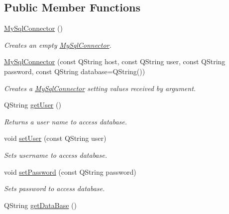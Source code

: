 \subsection*{Public Member Functions}
\begin{DoxyCompactItemize}
\item 
\mbox{\label{classMySqlConnector_af17a58a3749687938d0b3b15e276dab7}} 
\mbox{\hyperlink{classMySqlConnector_af17a58a3749687938d0b3b15e276dab7}{My\+Sql\+Connector}} ()
\begin{DoxyCompactList}\small\item\em Creates an empty \mbox{\hyperlink{classMySqlConnector}{My\+Sql\+Connector}}. \end{DoxyCompactList}\item 
\mbox{\hyperlink{classMySqlConnector_a86344c8e5fb792da1da746bdea3a2474}{My\+Sql\+Connector}} (const Q\+String host, const Q\+String user, const Q\+String password, const Q\+String database=Q\+String())
\begin{DoxyCompactList}\small\item\em Creates a \mbox{\hyperlink{classMySqlConnector}{My\+Sql\+Connector}} setting values received by argument. \end{DoxyCompactList}\item 
Q\+String \mbox{\hyperlink{classMySqlConnector_ae652c2a79321d979121e2347cbb25ba0}{get\+User}} ()
\begin{DoxyCompactList}\small\item\em Returns a user name to access database. \end{DoxyCompactList}\item 
void \mbox{\hyperlink{classMySqlConnector_a0cf4bedae2d4093449590aa59d200ce8}{set\+User}} (const Q\+String user)
\begin{DoxyCompactList}\small\item\em Sets username to access database. \end{DoxyCompactList}\item 
void \mbox{\hyperlink{classMySqlConnector_a92af1c28da0953a69573b21f68b8a41f}{set\+Password}} (const Q\+String password)
\begin{DoxyCompactList}\small\item\em Sets password to access database. \end{DoxyCompactList}\item 
Q\+String \mbox{\hyperlink{classMySqlConnector_a9bada8a552b17c5e39e7d1c903201b4b}{get\+Data\+Base}} ()

\end{DoxyCompactItemize}
